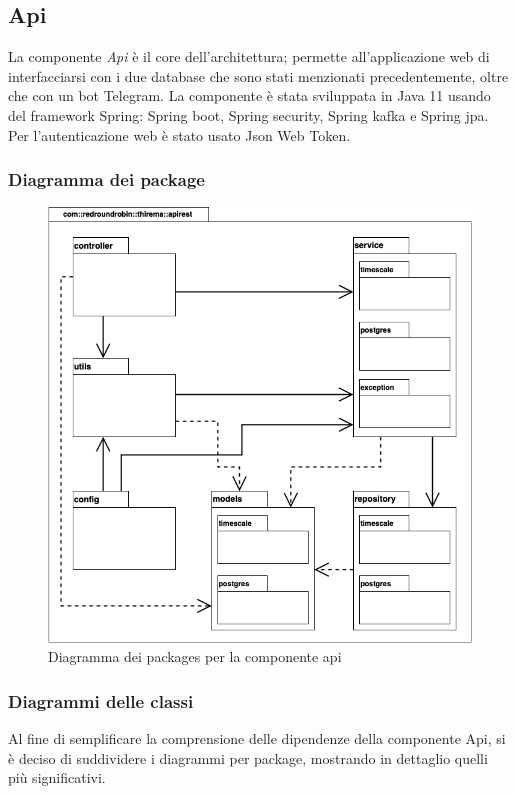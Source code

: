 \subsection{Api}
	La componente \textit{Api} è il core dell'architettura; permette all'applicazione web di interfacciarsi con i due database che sono stati menzionati precedentemente, oltre che con un bot Telegram.
	La componente è stata sviluppata in Java 11 usando del framework Spring: Spring boot, Spring security, Spring kafka e Spring jpa. Per l'autenticazione web è stato usato Json Web Token.

	\subsubsection{Diagramma dei package}%
		\begin{figure}[H]
			\centering
			\includegraphics[scale=0.500]{res/images/API/packageAPI.png}
			\caption{Diagramma dei packages per la componente api}
			\label{Diagramma 10}
		\end{figure}

	\subsubsection{Diagrammi delle classi}
		Al fine di semplificare la comprensione delle dipendenze della componente Api, si è deciso di suddividere i diagrammi per package, mostrando in dettaglio quelli più significativi.

